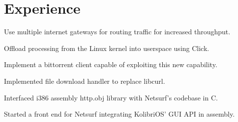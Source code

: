 \documentclass[letterpaper]{deedy-resume} %
\begin{document}
\hfill
%
%
\begin{minipage}[t]{0.66\textwidth} %


\section{Experience}


\vspace{\topsep} %

\begin{tightitemize}
\item Use multiple internet gateways for routing traffic for increased throughput.
\item Offload processing from the Linux kernel into userspace using Click.
\item Implement a bittorrent client capable of exploiting this new capability.
\end{tightitemize}

\sectionspace %



\begin{tightitemize}
\item Implemented file download handler to replace libcurl.
\item Interfaced i386 assembly http.obj library with Netsurf's codebase in C.
\item Started a front end for Netsurf integrating KolibriOS' GUI API in assembly.
\end{tightitemize}

\sectionspace %



\end{minipage}
\end{document}
